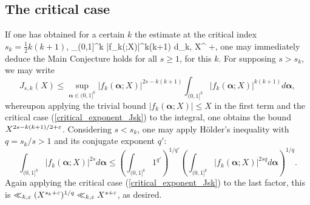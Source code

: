 \documentclass[brochure,english,12pt]{bourbaki}%
\newcommand{\albf}{\boldsymbol\alpha}
\begin{document}
\subsection{The critical case}\label{sec_VMVT_critical_case}
If one has obtained for a certain $k$ the estimate at the critical index $s_k = \frac{1}{2}k(k+1)$,
\beq\label{critical_exponent_Jsk}
\int_{(0,1]^k} |f_k(\albf;X)|^{k(k+1)} d\albf \ll_{k,\ep} X^{ +\ep}, 
\eeq
one may immediately deduce the Main Conjecture holds for all $s \geq 1$, for this $k$. For supposing $s > s_k$, we may write
\[
J_{s,k}(X)	\leq \sup_{\albf \in (0,1]^k} |f_k(\albf;X)|^{2s - k(k+1)}  \int_{(0,1]^k}  |f_k(\albf;X)|^{k(k+1)} d\albf,
\]
	whereupon applying the trivial bound $ |f_k(\albf;X)| \leq X$ in the first term and the critical case (\ref{critical_exponent_Jsk}) to the integral, 
one obtains the bound $X^{2s-k(k+1)/2+ \varepsilon}$.
Considering $s <s_k$, one may apply H\"{o}lder's inequality  with $q=s_k/s>1$ and its conjugate exponent $q'$:
\[
\int_{(0,1]^k}  |f_k(\albf;X)|^{2s} d\albf
	\leq ( \int_{(0,1]^k} 1^{q'})^{1/q'} \left( \int_{(0,1]^k} |f_k(\albf;X)|^{2sq} d\albf \right)^{1/q}.
\]
Again applying the critical case (\ref{critical_exponent_Jsk}) to the last factor, 
this is $\ll_{k,\varepsilon} (X^{s_k+\varepsilon})^{1/q} \ll_{k,\varepsilon} X^{s+\varepsilon}$, as desired.
\end{document}
